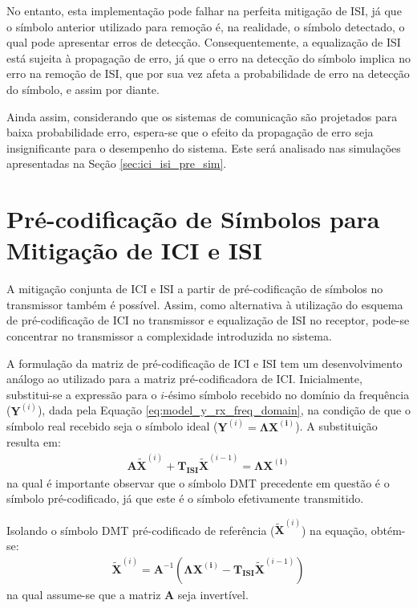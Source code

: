 No entanto, esta implementação pode falhar na perfeita mitigação de ISI, já que o símbolo anterior utilizado para remoção é, na realidade, o símbolo detectado, o qual pode apresentar erros de detecção. Consequentemente, a equalização de ISI está sujeita à propagação de erro, já que o erro na detecção do símbolo implica no erro na remoção de ISI, que por sua vez afeta a probabilidade de erro na detecção do símbolo, e assim por diante. 

Ainda assim, considerando que os sistemas de comunicação são projetados para baixa probabilidade erro, espera-se que o efeito da propagação de erro seja insignificante para o desempenho do sistema. Este será analisado nas simulações apresentadas na Seção \ref{sec:ici_isi_pre_sim}.

\section{Pré-codificação de Símbolos para Mitigação de ICI e ISI}
\label{sec:precodificacao_isi_ici}

A mitigação conjunta de ICI e ISI a partir de pré-codificação de símbolos no transmissor também é possível. Assim, como alternativa à utilização do esquema de pré-codificação de ICI no transmissor e equalização de ISI no receptor, pode-se concentrar no transmissor a complexidade introduzida no sistema.

A formulação da matriz de pré-codificação de ICI e ISI tem um desenvolvimento análogo ao utilizado para a matriz pré-codificadora de ICI. Inicialmente, substitui-se a expressão para o $i$-ésimo símbolo recebido no domínio da frequência ($\mathbf{Y}^{(i)}$), dada pela Equação \ref{eq:model_y_rx_freq_domain}, na condição de que o símbolo real recebido seja o símbolo ideal ($\mathbf{Y}^{(i)} =\mathbf{\Lambda} \mathbf{X^{(i)}}$). A substituição resulta em: 
\begin{align}
\mathbf{A} \mathbf{\tilde{X}}^{(i)} + \mathbf{ T_\text{ISI}} \mathbf{\tilde{X}}^{(i-1)} = \mathbf{\Lambda} \mathbf{X^{(i)}}\nonumber
\end{align}
na qual é importante observar que o símbolo DMT precedente em questão é o símbolo pré-codificado, já que este é o símbolo efetivamente transmitido.

Isolando o símbolo DMT pré-codificado de referência ($\mathbf{\tilde{X}}^{(i)}$) na equação, obtém-se:
\begin{align}
\mathbf{\tilde{X}}^{(i)} = \mathbf{A}^{-1} \left( \mathbf{\Lambda} \mathbf{X^{(i)}} - \mathbf{ T_\text{ISI}} \mathbf{\tilde{X}}^{(i-1)} \right)
\label{eq:precoder_ici_isi}
\end{align}
na qual assume-se que a matriz $\mathbf{A}$ seja invertível.


